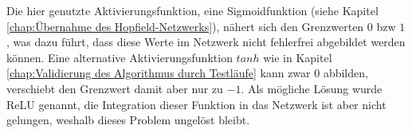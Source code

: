 Die hier genutzte Aktivierungsfunktion, eine Sigmoidfunktion (siehe Kapitel \ref{chap:Übernahme des Hopfield-Netzwerks}), nähert sich den Grenzwerten \(0\) bzw \(1\), was dazu führt, dass diese Werte im Netzwerk nicht fehlerfrei abgebildet werden können. Eine alternative Aktivierungsfunktion \(tanh\) wie in Kapitel \ref{chap:Validierung des Algorithmus durch Testläufe} kann zwar \(0\) abbilden, verschiebt den Grenzwert damit aber nur zu \(-1\). Als mögliche Lösung wurde ReLU genannt, die Integration dieser Funktion in das Netzwerk ist aber nicht gelungen, weshalb dieses Problem ungelöst bleibt.
